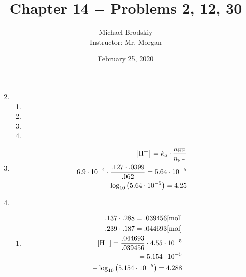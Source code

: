 \documentclass[12pt]{article}
\title{Chapter 14 $-$ Problems 2, 12, 30}
\date{February 25, 2020}
\author{Michael Brodskiy\\ \small Instructor: Mr. Morgan}
\begin{document}
\maketitle

\begin{enumerate}

    \setcounter{enumi}{1}

  \item

    \begin{enumerate}

      \item {}

      \item {}

      \item {}

      \item {}

    \end{enumerate}

    \setcounter{enumi}{11}

  \item {}

    \begin{equation}
      \begin{split}
        \left[ \ce{H+} \right]=k_a\cdot\frac{n_{\ce{HF}}}{n_{\ce{F-}}}\\
        6.9\cdot10^{-4}\cdot\frac{.127\cdot .0399}{.062}=5.64\cdot10^{-5}\\
        -\log_{10}\left( 5.64\cdot10^{-5} \right)=4.25
      \end{split}
      \label{1}
    \end{equation}

    \setcounter{enumi}{29}

  \item

    \begin{enumerate}

      \item 

        \begin{equation}
          \begin{split}
            .137\cdot.288=.039456[\si{\mole}]\\
            .239\cdot.187=.044693[\si{\mole}]\\
            [\ce{H+}]=\frac{.044693}{.039456}\cdot4.55\cdot10^{-5}\\
            =5.154\cdot10^{-5}\\
            -\log_{10}\left( 5.154\cdot10^{-5} \right)=4.288
          \end{split}
          \label{2}
        \end{equation}


\end{enumerate}
\end{enumerate}
\end{document}
